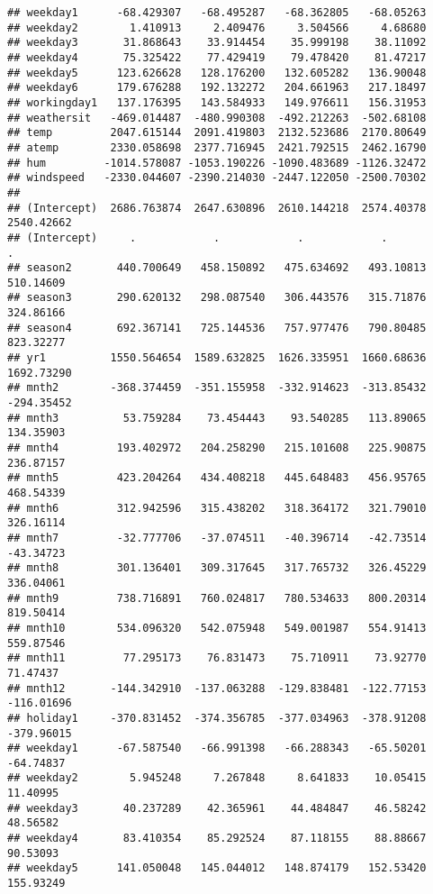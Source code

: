 \documentclass[]{article}
\begin{document}
\begin{verbatim}
## weekday1      -68.429307   -68.495287   -68.362805   -68.05263
## weekday2        1.410913     2.409476     3.504566     4.68680
## weekday3       31.868643    33.914454    35.999198    38.11092
## weekday4       75.325422    77.429419    79.478420    81.47217
## weekday5      123.626628   128.176200   132.605282   136.90048
## weekday6      179.676288   192.132272   204.661963   217.18497
## workingday1   137.176395   143.584933   149.976611   156.31953
## weathersit   -469.014487  -480.990308  -492.212263  -502.68108
## temp         2047.615144  2091.419803  2132.523686  2170.80649
## atemp        2330.058698  2377.716945  2421.792515  2462.16790
## hum         -1014.578087 -1053.190226 -1090.483689 -1126.32472
## windspeed   -2330.044607 -2390.214030 -2447.122050 -2500.70302
##                                                                           
## (Intercept)  2686.763874  2647.630896  2610.144218  2574.40378  2540.42662
## (Intercept)     .            .            .            .           .      
## season2       440.700649   458.150892   475.634692   493.10813   510.14609
## season3       290.620132   298.087540   306.443576   315.71876   324.86166
## season4       692.367141   725.144536   757.977476   790.80485   823.32277
## yr1          1550.564654  1589.632825  1626.335951  1660.68636  1692.73290
## mnth2        -368.374459  -351.155958  -332.914623  -313.85432  -294.35452
## mnth3          53.759284    73.454443    93.540285   113.89065   134.35903
## mnth4         193.402972   204.258290   215.101608   225.90875   236.87157
## mnth5         423.204264   434.408218   445.648483   456.95765   468.54339
## mnth6         312.942596   315.438202   318.364172   321.79010   326.16114
## mnth7         -32.777706   -37.074511   -40.396714   -42.73514   -43.34723
## mnth8         301.136401   309.317645   317.765732   326.45229   336.04061
## mnth9         738.716891   760.024817   780.534633   800.20314   819.50414
## mnth10        534.096320   542.075948   549.001987   554.91413   559.87546
## mnth11         77.295173    76.831473    75.710911    73.92770    71.47437
## mnth12       -144.342910  -137.063288  -129.838481  -122.77153  -116.01696
## holiday1     -370.831452  -374.356785  -377.034963  -378.91208  -379.96015
## weekday1      -67.587540   -66.991398   -66.288343   -65.50201   -64.74837
## weekday2        5.945248     7.267848     8.641833    10.05415    11.40995
## weekday3       40.237289    42.365961    44.484847    46.58242    48.56582
## weekday4       83.410354    85.292524    87.118155    88.88667    90.53093
## weekday5      141.050048   145.044012   148.874179   152.53420   155.93249

\end{verbatim}
\end{document}
